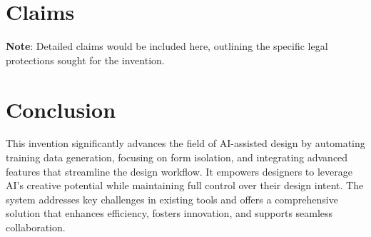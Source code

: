 \documentclass{article}
\begin{document}
\section{Claims}

\textbf{Note}: Detailed claims would be included here, outlining the specific legal protections sought for the invention.

\section{Conclusion}

This invention significantly advances the field of AI-assisted design by automating training data generation, focusing on form isolation, and integrating advanced features that streamline the design workflow. It empowers designers to leverage AI's creative potential while maintaining full control over their design intent. The system addresses key challenges in existing tools and offers a comprehensive solution that enhances efficiency, fosters innovation, and supports seamless collaboration.
\end{document}
